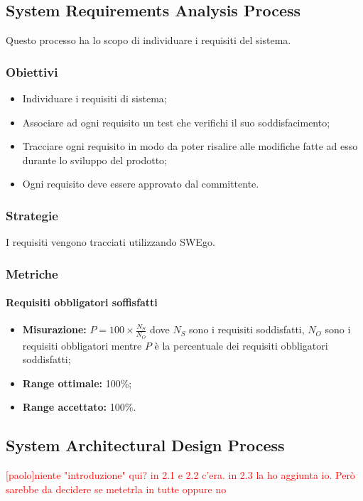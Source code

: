 \subsection{System Requirements Analysis Process}
Questo processo ha lo scopo di individuare i requisiti del sistema.
\subsubsection{Obiettivi}
\begin{itemize}
	\item Individuare i requisiti di sistema;
	\item Associare ad ogni requisito un test che verifichi il suo soddisfacimento; 
	\item Tracciare ogni requisito in modo da poter risalire alle modifiche fatte ad esso durante lo sviluppo del prodotto;
	\item Ogni requisito deve essere approvato dal committente.
\end{itemize}
\subsubsection{Strategie}
I requisiti vengono tracciati utilizzando SWEgo.
\subsubsection{Metriche}
\paragraph{Requisiti obbligatori soffisfatti}
\begin{itemize}
	\item \textbf{Misurazione:} $P=100\times\frac{N_S}{N_O}$ dove $N_S$ sono i requisiti soddisfatti, $N_O$ sono i requisiti obbligatori mentre $P$ è la percentuale dei requisiti obbligatori soddisfatti;
	\item \textbf{Range ottimale:} 100\%;
	\item \textbf{Range accettato:} 100\%.
\end{itemize}

\subsection{System Architectural Design Process}
\textcolor{red} { [paolo]niente "introduzione" qui? in 2.1 e 2.2 c'era. in 2.3 la ho aggiunta io. Però sarebbe da decidere se metetrla in tutte oppure no }
